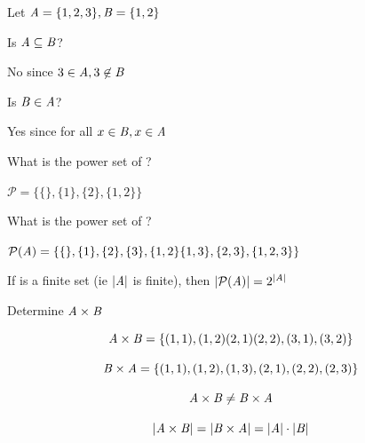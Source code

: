 \documentclass[../../Main.tex]{subfiles}
\begin{document}
\begin{example}
    Let $\mathit{A} = \{ 1, 2, 3 \}, \mathit{B} = \{ 1, 2 \}$

    \begin{alphabet}
        \item
            Is $\mathit{A} \subseteq \mathit{B}$?
            
            \begin{solution}
                No since $3 \in \mathit{A}, 3 \not \in \mathit{B}$
            \end{solution}

        \item
            Is $\mathit{B} \in \mathit{A}$?

            \begin{solution}
                Yes since for all $x \in \mathit{B}, x \in \mathit{A}$ 
            \end{solution}

        \item
            What is the power set of ?

            \begin{solution}
                $\mathcal{P} = \{ \{ \}, \{ 1 \}, \{ 2 \}, \{ 1, 2 \} \}$
            \end{solution}
        \item
            What is the power set of ?

            \begin{solution}
                $\mathcal{P}(\mathit{A}) = \{  \{  \}, \{ 1 \}, \{ 2 \}, \{ 3 \}, \{ 1, 2 \} \{ 1, 3 \}, \{ 2, 3 \}, \{ 1, 2, 3 \}  \}$
            \end{solution}

            \begin{note}
                If  is a finite set (ie $| \mathit{A} |$ is finite), then $| \mathcal{P} (\mathit{A}) | = 2^{|\mathit{A}|}$ 
            \end{note} 

        \item
            Determine $\mathit{A} \times \mathit{B}$
            
            \begin{solution}
                $$ \mathit{A} \times \mathit{B} = \{  (1, 1), (1, 2) (2, 1) (2, 2), (3, 1), (3, 2)  \} $$

                $$ \mathit{B} \times \mathit{A} = \{  (1, 1), (1, 2), (1, 3), (2, 1), (2, 2), (2, 3)  \} $$

                $$ \mathit{A} \times \mathit{B} \not = \mathit{B} \times \mathit{A}$$

                $$ | \mathit{A} \times \mathit{B} | = | \mathit{B} \times \mathit{A} | = | \mathit{A} | \cdot | \mathit{B} | $$
            \end{solution}
    \end{alphabet}
\end{example}

\end{document}
